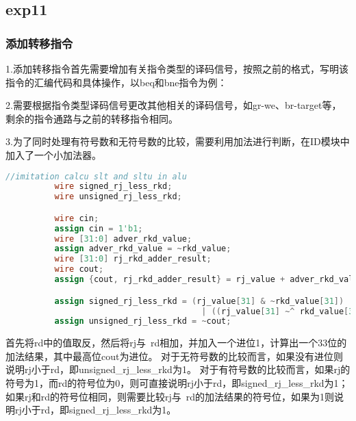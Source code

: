 \documentclass[12pt,a4paper]{article}
\begin{document}
    \subsection{exp11}
        \subsubsection{添加转移指令}
          1.添加转移指令首先需要增加有关指令类型的译码信号，按照之前的格式，写明该指令的汇编代码和具体操作，以beq和bne指令为例：
          \par
          2.需要根据指令类型译码信号更改其他相关的译码信号，如gr-we、br-target等，剩余的指令通路与之前的转移指令相同。
          \par
          3.为了同时处理有符号数和无符号数的比较，需要利用加法进行判断，在ID模块中加入了一个小加法器。
          \begin{lstlisting}[language=Verilog]
            //imitation calcu slt and sltu in alu
          wire signed_rj_less_rkd;
          wire unsigned_rj_less_rkd;

          wire cin;
          assign cin = 1'b1;
          wire [31:0] adver_rkd_value;
          assign adver_rkd_value = ~rkd_value;
          wire [31:0] rj_rkd_adder_result;
          wire cout;
          assign {cout, rj_rkd_adder_result} = rj_value + adver_rkd_value + cin;

          assign signed_rj_less_rkd = (rj_value[31] & ~rkd_value[31])
                                        | ((rj_value[31] ~^ rkd_value[31]) & rj_rkd_adder_result[31]);
          assign unsigned_rj_less_rkd = ~cout;  
          \end{lstlisting}
          首先将rd中的值取反，然后将rj与~rd相加，并加入一个进位1，计算出一个33位的加法结果，其中最高位cout为进位。
          对于无符号数的比较而言，如果没有进位则说明rj小于rd，即unsigned\_rj\_less\_rkd为1。
          对于有符号数的比较而言，如果rj的符号为1，而rd的符号位为0，则可直接说明rj小于rd，即signed\_rj\_less\_rkd为1；
          如果rj和rd的符号位相同，则需要比较rj与~rd的加法结果的符号位，如果为1则说明rj小于rd，即signed\_rj\_less\_rkd为1。
        
\end{document}
